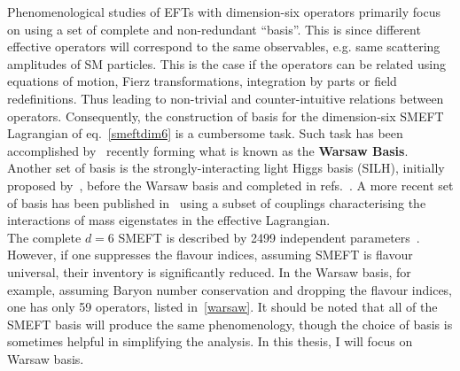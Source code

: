 Phenomenological studies of EFTs with dimension-six operators primarily focus on using a set of complete and non-redundant ``basis''. This is since different effective operators will correspond to the same observables, e.g. same scattering amplitudes of SM particles.  This is the case if the operators can be related using equations of motion, Fierz transformations, integration by parts or field redefinitions. Thus leading to non-trivial and counter-intuitive relations between operators. Consequently, the construction of basis for the dimension-six SMEFT Lagrangian of eq.~\eqref{smeftdim6} is a cumbersome task. Such task has been accomplished by~\cite{Grzadkowski:2010es} recently forming what is known as the \textbf{Warsaw Basis}.  Another set of basis is the strongly-interacting light Higgs basis (SILH), initially proposed by~\cite{Giudice:2007fh}, before the Warsaw basis and completed in refs.~\cite{Contino:2013kra, Elias-Miro:2013eta}. A more recent set of basis has been published in~\cite{Gupta:2014rxa} using a subset of couplings characterising the interactions of mass eigenstates in the effective Lagrangian.\\
The complete $d=6$ SMEFT is described by 2499 independent parameters~\cite{Jenkins:2013zja,Jenkins:2013wua,Alonso:2013hga}. However, if one suppresses the flavour indices, assuming SMEFT is flavour universal, their inventory is significantly reduced. In the Warsaw basis, for example, assuming Baryon number conservation and dropping the flavour indices, one has only 59 operators, listed in~\autoref{warsaw}. It should be noted that all of the SMEFT basis will produce the same phenomenology, though the choice of basis is sometimes helpful in simplifying the analysis. In this thesis, I will focus on Warsaw basis.\\ 
